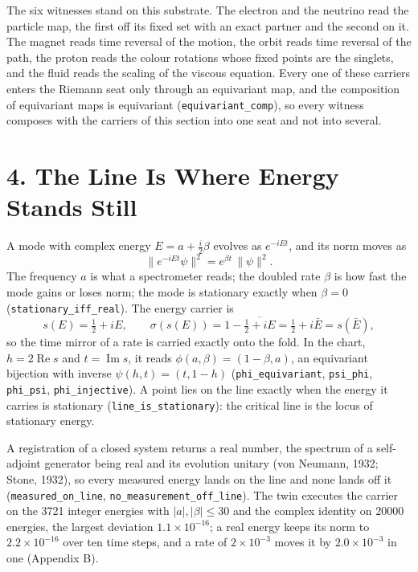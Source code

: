 \documentclass[10pt]{article}
\begin{document}
The six witnesses stand on this substrate. The electron and the neutrino
read the particle map, the first off its fixed set with an exact partner
and the second on it. The magnet reads time reversal of the motion, the
orbit reads time reversal of the path, the proton reads the colour
rotations whose fixed points are the singlets, and the fluid reads the
scaling of the viscous equation. Every one of these carriers enters the
Riemann seat only through an equivariant map, and the composition of
equivariant maps is equivariant (\texttt{equivariant\_comp}), so every
witness composes with the carriers of this section into one seat and not
into several.

\hypertarget{the-line-is-where-energy-stands-still}{%
\section{4. The Line Is Where Energy Stands
Still}\label{the-line-is-where-energy-stands-still}}

A mode with complex energy \(E=a+\tfrac{i}{2}\beta\) evolves as
\(e^{-iEt}\), and its norm moves as
\[\bigl\|e^{-iEt}\psi\bigr\|^{2}=e^{\beta t}\,\|\psi\|^{2}.\] The
frequency \(a\) is what a spectrometer reads; the doubled rate \(\beta\)
is how fast the mode gains or loses norm; the mode is stationary exactly
when \(\beta=0\) (\texttt{stationary\_iff\_real}). The energy carrier is
\[s(E)=\tfrac12+iE,\qquad \sigma(s(E))=1-\overline{\tfrac12+iE}=\tfrac12+i\bar E=s(\bar E),\]
so the time mirror of a rate is carried exactly onto the fold. In the
chart, \(h=2\operatorname{Re}s\) and \(t=\operatorname{Im}s\), it reads
\(\phi(a,\beta)=(1-\beta,a)\), an equivariant bijection with inverse
\(\psi(h,t)=(t,1-h)\) (\texttt{phi\_equivariant}, \texttt{psi\_phi},
\texttt{phi\_psi}, \texttt{phi\_injective}). A point lies on the line
exactly when the energy it carries is stationary
(\texttt{line\_is\_stationary}): the critical line is the locus of
stationary energy.

A registration of a closed system returns a real number, the spectrum of
a self-adjoint generator being real and its evolution unitary (von
Neumann, 1932; Stone, 1932), so every measured energy lands on the line
and none lands off it (\texttt{measured\_on\_line},
\texttt{no\_measurement\_off\_line}). The twin executes the carrier on
the 3721 integer energies with \(|a|,|\beta|\le 30\) and the complex
identity on 20000 energies, the largest deviation \(1.1\times10^{-16}\);
a real energy keeps its norm to \(2.2\times10^{-16}\) over ten time
steps, and a rate of \(2\times10^{-3}\) moves it by \(2.0\times10^{-3}\)
in one (Appendix B).
\end{document}
